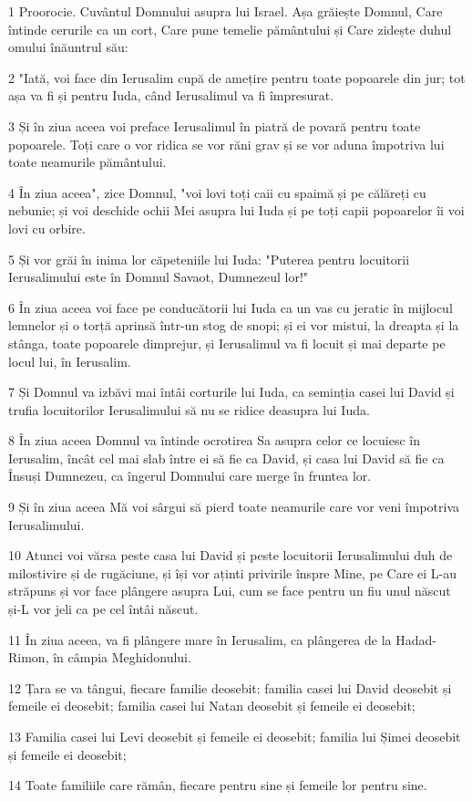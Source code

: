\par 1 Proorocie. Cuvântul Domnului asupra lui Israel. Așa grăiește Domnul, Care întinde cerurile ca un cort, Care pune temelie pământului și Care zidește duhul omului înăuntrul său:
\par 2 "Iată, voi face din Ierusalim cupă de amețire pentru toate popoarele din jur; tot așa va fi și pentru Iuda, când Ierusalimul va fi împresurat.
\par 3 Și în ziua aceea voi preface Ierusalimul în piatră de povară pentru toate popoarele. Toți care o vor ridica se vor răni grav și se vor aduna împotriva lui toate neamurile pământului.
\par 4 În ziua aceea", zice Domnul, "voi lovi toți caii cu spaimă și pe călăreți cu nebunie; și voi deschide ochii Mei asupra lui Iuda și pe toți capii popoarelor îi voi lovi cu orbire.
\par 5 Și vor grăi în inima lor căpeteniile lui Iuda: "Puterea pentru locuitorii Ierusalimului este în Domnul Savaot, Dumnezeul lor!"
\par 6 În ziua aceea voi face pe conducătorii lui Iuda ca un vas cu jeratic în mijlocul lemnelor și o torță aprinsă într-un stog de snopi; și ei vor mistui, la dreapta și la stânga, toate popoarele dimprejur, și Ierusalimul va fi locuit și mai departe pe locul lui, în Ierusalim.
\par 7 Și Domnul va izbăvi mai întâi corturile lui Iuda, ca seminția casei lui David și trufia locuitorilor Ierusalimului să nu se ridice deasupra lui Iuda.
\par 8 În ziua aceea Domnul va întinde ocrotirea Sa asupra celor ce locuiesc în Ierusalim, încât cel mai slab între ei să fie ca David, și casa lui David să fie ca Însuși Dumnezeu, ca îngerul Domnului care merge în fruntea lor.
\par 9 Și în ziua aceea Mă voi sârgui să pierd toate neamurile care vor veni împotriva Ierusalimului.
\par 10 Atunci voi vărsa peste casa lui David și peste locuitorii Ierusalimului duh de milostivire și de rugăciune, și își vor aținti privirile înspre Mine, pe Care ei L-au străpuns și vor face plângere asupra Lui, cum se face pentru un fiu unul născut și-L vor jeli ca pe cel întâi născut.
\par 11 În ziua aceea, va fi plângere mare în Ierusalim, ca plângerea de la Hadad-Rimon, în câmpia Meghidonului.
\par 12 Țara se va tângui, fiecare familie deosebit: familia casei lui David deosebit și femeile ei deosebit; familia casei lui Natan deosebit și femeile ei deosebit;
\par 13 Familia casei lui Levi deosebit și femeile ei deosebit; familia lui Șimei deosebit și femeile ei deosebit;
\par 14 Toate familiile care rămân, fiecare pentru sine și femeile lor pentru sine.

